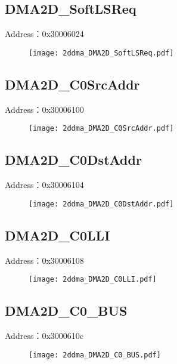 \subsection{DMA2D\_SoftLSReq}
\label{2ddma-DMA2D-SoftLSReq}
Address：0x30006024
 \begin{figure}[H]
\texttt{[image: 2ddma\_DMA2D\_SoftLSReq.pdf]}
\end{figure}

\subsection{DMA2D\_C0SrcAddr}
\label{2ddma-DMA2D-C0SrcAddr}
Address：0x30006100
 \begin{figure}[H]
\texttt{[image: 2ddma\_DMA2D\_C0SrcAddr.pdf]}
\end{figure}

\subsection{DMA2D\_C0DstAddr}
\label{2ddma-DMA2D-C0DstAddr}
Address：0x30006104
 \begin{figure}[H]
\texttt{[image: 2ddma\_DMA2D\_C0DstAddr.pdf]}
\end{figure}

\subsection{DMA2D\_C0LLI}
\label{2ddma-DMA2D-C0LLI}
Address：0x30006108
 \begin{figure}[H]
\texttt{[image: 2ddma\_DMA2D\_C0LLI.pdf]}
\end{figure}

\subsection{DMA2D\_C0\_BUS}
\label{2ddma-DMA2D-C0-BUS}
Address：0x3000610c
 \begin{figure}[H]
\texttt{[image: 2ddma\_DMA2D\_C0\_BUS.pdf]}
\end{figure}

